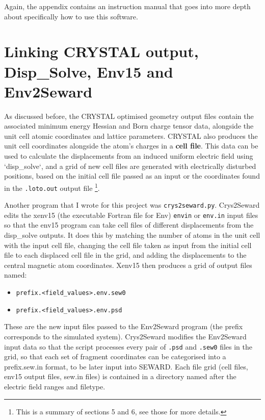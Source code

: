 \documentclass[10pt]{article}
\begin{document}
Again, the appendix contains an instruction manual that goes into more depth about specifically how to use this software.

\section{Linking CRYSTAL output, Disp\_Solve, Env15 and Env2Seward}

As discussed before, the CRYSTAL optimised geometry output files contain the associated minimum energy Hessian and Born charge tensor data, alongside the unit cell atomic coordinates and lattice parameters. CRYSTAL also produces the unit cell coordinates alongside the atom's charges in a \textbf{cell file}. This data can be used to calculate the displacements from an induced uniform electric field using `disp\_solve`, and a grid of new cell files are generated with electrically disturbed positions, based on the initial cell file passed as an input or the coordinates found in the \texttt{.loto.out} output file \footnote{This is a summary of sections 5 and 6, see those for more details.}. 

Another program that I wrote for this project was \texttt{crys2seward.py}. Crys2Seward edits the xenv15 (the executable Fortran file for Env) \texttt{envin} or \texttt{env.in} input files so that the env15 program can take cell files of different displacements from the disp\_solve outputs. It does this by matching the number of atoms in the unit cell with the input cell file, changing the cell file taken as input from the initial cell file to each displaced cell file in the grid, and adding the displacements to the central magnetic atom coordinates. Xenv15 then produces a grid of output files named: 

\begin{itemize}
	\item \texttt{prefix.<field\_values>.env.sew0}
	\item \texttt{prefix.<field\_values>.env.psd}
\end{itemize}

These are the new input files passed to the Env2Seward program (the prefix corresponds to the simulated system). Crys2Seward modifies the Env2Seward input data so that the script processes every pair of \texttt{.psd} and \texttt{.sew0} files in the grid, so that each set of fragment coordinates can be categorised into a prefix.sew.in format, to be later input into SEWARD. Each file grid (cell files, env15 output files, sew.in files) is contained in a directory named after the electric field ranges and filetype.
\end{document}
